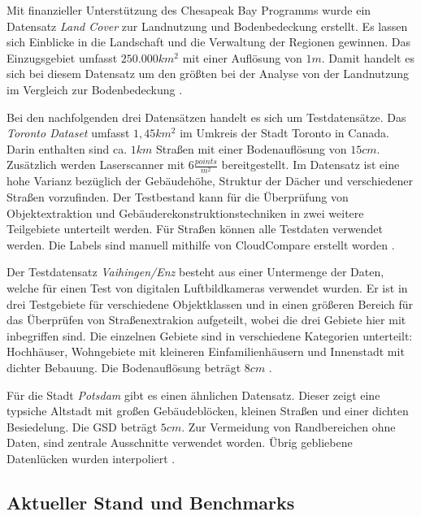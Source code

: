 Mit finanzieller Unterstützung des Chesapeak Bay Programms wurde ein Datensatz \textit{Land Cover} zur Landnutzung und Bodenbedeckung erstellt.
Es lassen sich Einblicke in die Landschaft und die Verwaltung der Regionen gewinnen.
Das Einzugsgebiet umfasst $250.000km^2$ mit einer Auflösung von $1m$. 
Damit handelt es sich bei diesem Datensatz um den größten bei der Analyse von der Landnutzung im Vergleich zur Bodenbedeckung \cite{ChesapeakeConservancy.02.06.2022}.

Bei den nachfolgenden drei Datensätzen handelt es sich um Testdatensätze.
Das \textit{Toronto Dataset} umfasst $1,45km^2$ im Umkreis der Stadt Toronto in Canada. 
Darin enthalten sind ca. $1 km$ Straßen mit einer Bodenauflösung von $15cm$. 
Zusätzlich werden Laserscanner mit $6 \frac{points}{m^2}$ bereitgestellt.
Im Datensatz ist eine hohe Varianz bezüglich der Gebäudehöhe, Struktur der Dächer und verschiedener Straßen vorzufinden.
Der Testbestand kann für die Überprüfung von Objektextraktion und Gebäuderekonstruktionstechniken in zwei weitere Teilgebiete unterteilt werden.
Für Straßen können alle Testdaten verwendet werden.
Die Labels sind manuell mithilfe von CloudCompare erstellt worden \cite{Englich.06.10.2022b,Tan.2020}.

Der Testdatensatz \textit{Vaihingen/Enz} besteht aus einer Untermenge der Daten, welche für einen Test von digitalen Luftbildkameras verwendet wurden.
Er ist in drei Testgebiete für verschiedene Objektklassen und in einen größeren Bereich für das Überprüfen von Straßenextrakion aufgeteilt, wobei die drei Gebiete hier mit inbegriffen sind.
Die einzelnen Gebiete sind in verschiedene Kategorien unterteilt: Hochhäuser, Wohngebiete mit kleineren Einfamilienhäusern und Innenstadt mit dichter Bebauung.
Die Bodenauflösung beträgt $8cm$ \cite{Englich.06.10.2022b}.

Für die Stadt \textit{Potsdam} gibt es einen ähnlichen Datensatz. 
Dieser zeigt eine typsiche Altstadt mit großen Gebäudeblöcken, kleinen Straßen und einer dichten Besiedelung.
Die \ac{GSD} beträgt $5cm$.
Zur Vermeidung von Randbereichen ohne Daten, sind zentrale Ausschnitte verwendet worden.
Übrig gebliebene Datenlücken wurden interpoliert \cite{Englich.17.11.2022}.

\subsection{Aktueller Stand und Benchmarks} \label{sec:state-of-the-art-roads} %

